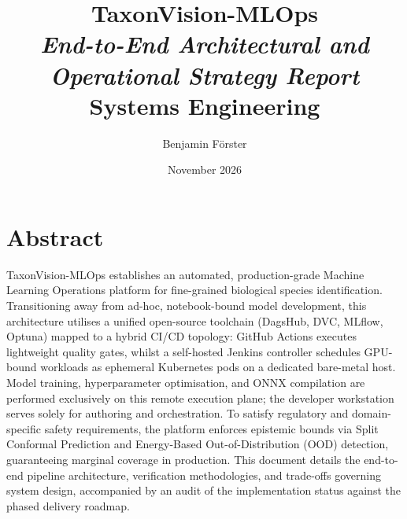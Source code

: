 \documentclass[10pt,a4paper,oneside]{book}
\title{\Huge \textbf{TaxonVision-MLOps}\\[0.5cm] 
\LARGE \textit{End-to-End Architectural and Operational Strategy Report}\\[0.5cm]
\Large Systems Engineering}
\author{\Large Benjamin Förster}
\date{November 2026}
\begin{document}
\frontmatter
{}
\maketitle
{}

\chapter*{Abstract}
TaxonVision-MLOps establishes an automated, production-grade Machine Learning Operations platform for fine-grained biological species identification. Transitioning away from ad-hoc, notebook-bound model development, this architecture utilises a unified open-source toolchain (DagsHub, DVC, MLflow, Optuna) mapped to a hybrid CI/CD topology: GitHub Actions executes lightweight quality gates, whilst a self-hosted Jenkins controller schedules GPU-bound workloads as ephemeral Kubernetes pods on a dedicated bare-metal host. Model training, hyperparameter optimisation, and ONNX compilation are performed exclusively on this remote execution plane; the developer workstation serves solely for authoring and orchestration. To satisfy regulatory and domain-specific safety requirements, the platform enforces epistemic bounds via Split Conformal Prediction and Energy-Based Out-of-Distribution (OOD) detection, guaranteeing marginal coverage in production. This document details the end-to-end pipeline architecture, verification methodologies, and trade-offs governing system design, accompanied by an audit of the implementation status against the phased delivery roadmap.

\tableofcontents

\mainmatter













\backmatter
\nocite{*}


\end{document}
